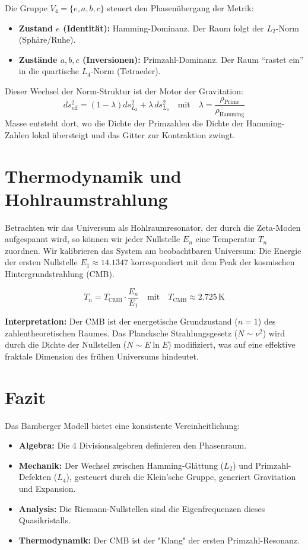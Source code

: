 \documentclass[11pt, a4paper]{article}
\begin{document}
	Die Gruppe $V_4 = \{e, a, b, c\}$ steuert den Phasenübergang der Metrik:
	\begin{itemize}
		\item \textbf{Zustand $e$ (Identität):} Hamming-Dominanz. Der Raum folgt der $L_2$-Norm (Sphäre/Ruhe).
		\item \textbf{Zustände $a,b,c$ (Inversionen):} Primzahl-Dominanz. Der Raum "`rastet ein"' in die quartische $L_4$-Norm (Tetraeder).
	\end{itemize}
	
	Dieser Wechsel der Norm-Struktur ist der Motor der Gravitation:
	\begin{equation}
		ds^2_{\text{eff}} = (1 - \lambda) ds^2_{L_2} + \lambda \, ds^2_{L_4} \quad \text{mit} \quad \lambda = \frac{\rho_{\text{Prime}}}{\rho_{\text{Hamming}}}
	\end{equation}
	Masse entsteht dort, wo die Dichte der Primzahlen die Dichte der Hamming-Zahlen lokal übersteigt und das Gitter zur Kontraktion zwingt.
	
	\section{Thermodynamik und Hohlraumstrahlung}
	
	Betrachten wir das Universum als Hohlraumresonator, der durch die Zeta-Moden aufgespannt wird, so können wir jeder Nullstelle $E_n$ eine Temperatur $T_n$ zuordnen. Wir kalibrieren das System am beobachtbaren Universum: Die Energie der ersten Nullstelle $E_1 \approx 14.1347$ korrespondiert mit dem Peak der kosmischen Hintergrundstrahlung (CMB).
	
	\begin{equation}
		T_n = T_{\text{CMB}} \cdot \frac{E_n}{E_1} \quad \text{mit} \quad T_{\text{CMB}} \approx 2.725\, \text{K}
	\end{equation}
	
	\textbf{Interpretation:} Der CMB ist der energetische Grundzustand ($n=1$) des zahlentheoretischen Raumes. Das Plancksche Strahlungsgesetz ($N \sim \nu^2$) wird durch die Dichte der Nullstellen ($N \sim E \ln E$) modifiziert, was auf eine effektive fraktale Dimension des frühen Universums hindeutet.
	
	\section{Fazit}
	Das Bamberger Modell bietet eine konsistente Vereinheitlichung:
	\begin{itemize}
		\item \textbf{Algebra:} Die 4 Divisionsalgebren definieren den Phasenraum.
		\item \textbf{Mechanik:} Der Wechsel zwischen Hamming-Glättung ($L_2$) und Primzahl-Defekten ($L_4$), gesteuert durch die Klein'sche Gruppe, generiert Gravitation und Expansion.
		\item \textbf{Analysis:} Die Riemann-Nullstellen sind die Eigenfrequenzen dieses Quasikristalls.
		\item \textbf{Thermodynamik:} Der CMB ist der "Klang" der ersten Primzahl-Resonanz.
	\end{itemize}
	
\end{document}
